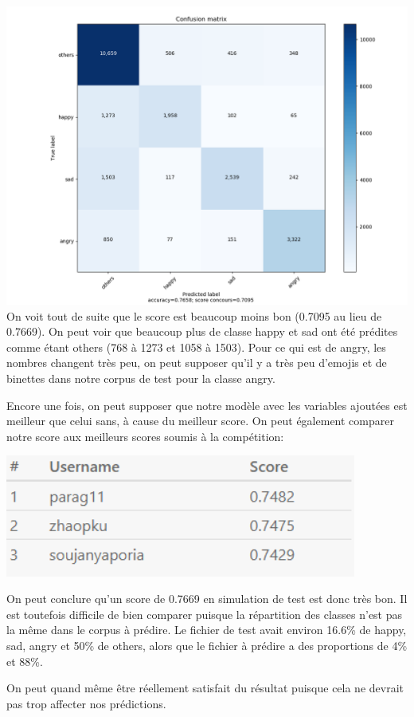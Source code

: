\includegraphics[width=\linewidth,keepaspectratio]{images/confusion_matrix_sans_features}
On voit tout de suite que le score est beaucoup moins bon (0.7095 au lieu de 0.7669). On peut voir que beaucoup plus de classe happy et sad ont été prédites comme étant others (768 à 1273 et 1058 à 1503). Pour ce qui est de angry, les nombres changent très peu, on peut  supposer qu'il y a très peu d'emojis et de binettes dans notre corpus de test pour la classe angry.

Encore une fois, on peut supposer que notre modèle avec les variables ajoutées est meilleur que celui sans, à cause du meilleur score. On peut également comparer notre score aux meilleurs scores soumis à la compétition:

\includegraphics[width=\linewidth,height=4cm,keepaspectratio]{images/meilleurs_scores}

On peut conclure qu'un score de 0.7669 en simulation de test est donc très bon. Il est toutefois difficile de bien comparer puisque la répartition des classes n'est pas la même dans le corpus à prédire. Le fichier de test avait environ 16.6\% de happy, sad, angry et 50\% de others, alors que le fichier à prédire a des proportions de 4\% et 88\%. 

On peut quand même être réellement satisfait du résultat puisque cela ne devrait pas trop affecter nos prédictions.